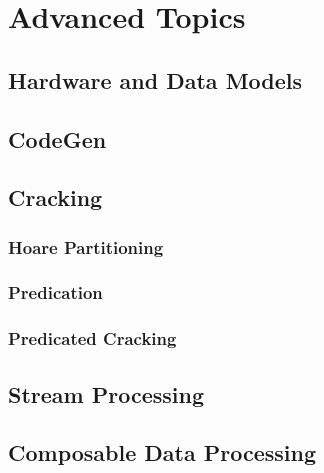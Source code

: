 \chapter{Advanced Topics}
\unfinished
\section{Hardware and Data Models}

\section{CodeGen}

\section{Cracking}
\subsection{Hoare Partitioning}
\subsection{Predication}
\subsection{Predicated Cracking}
\section{Stream Processing}
\section{Composable Data Processing}

